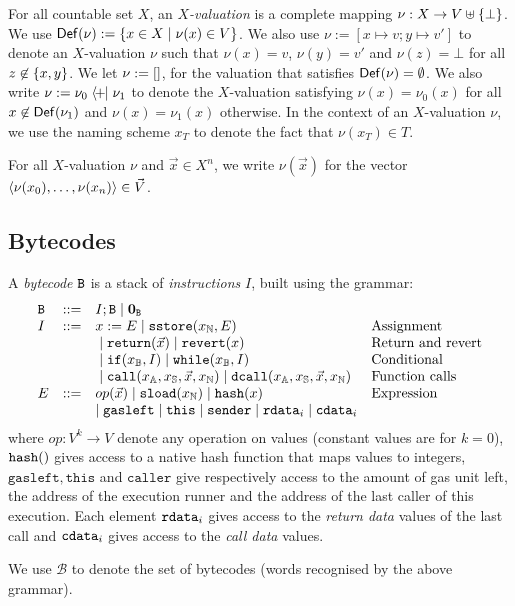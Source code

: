 \documentclass[14pt]{extarticle}
\begin{document}
For all countable set $X$, an \emph{$X$-valuation} is a complete mapping $\nu: X \to V\uplus\{\bot\}$. We use $\mathsf{Def}(\nu):= \{x\in X\mid \nu(x)\in V\}$. We also use $\nu:=[x\mapsto v; y\mapsto v']$ to denote an $X$-valuation $\nu$ such that $\nu(x)=v$, $\nu(y)=v'$ and $\nu(z)=\bot$ for all $z\not\in\{x,y\}$. We let $\nu:=[]$, for the valuation that satisfies $\mathsf{Def}(\nu)=\emptyset$. We also write $\nu:=\nu_0\mathrel{\bf\langle\!+\!\!\mid} \nu_1$ to denote the $X$-valuation satisfying $\nu(x)=\nu_0(x)$ for all $x\not\in\mathsf{Def}(\nu_1)$ and $\nu(x)=\nu_1(x)$ otherwise. In the context of an $X$-valuation $\nu$, we use the naming scheme $x_T$ to denote the fact that $\nu(x_T)\in T$. 

For all $X$-valuation $\nu$ and $\vec x\in X^n$, we write $\nu(\vec x)$ for the vector $\langle{\nu(x_0),\dots,\nu(x_n)}\rangle\in\vec V$.

\subsection{Bytecodes}
A \emph{bytecode} $\mathtt{B}$ is a stack of \emph{instructions} $I$, built using the grammar:
$$\begin{array}{lcll}
\mathtt{B} &:: =& I ; \mathtt{B} \mid \mathbf{0}_{\mathtt{B}} \\
I & :: =& x:=E \mid \mathtt{sstore}(x_{\mathbb{N}},E) & \hbox{Assignment} \\
&&{}\mid \mathtt{return}(\vec x) \mid \mathtt{revert}(x) & \hbox{Return and revert} \\
&& {}\mid \mathtt{if}(x_{\mathbb{B}}, I) \mid \mathtt{while}(x_{\mathbb{B}},I)  & \hbox{Conditional}\\
&&{}\mid \mathtt{call}(x_{\mathbb{A}}, x_{\mathbb{S}}, \vec x, x_{\mathbb{N}}) \mid  \mathtt{dcall}(x_{\mathbb{A}}, x_{\mathbb{S}}, \vec x, x_{\mathbb{N}}) & \hbox{Function calls} \\
E & ::= & op(\vec x)\mid \mathtt{sload}(x_{\mathbb{N}})\mid\mathtt{hash}(x) & \hbox{Expression} \\ 
&& \mid \mathtt{gasleft} \mid \mathtt{this} \mid \mathtt{sender}\mid \mathtt{rdata}_i \mid\mathtt{cdata}_i 
\end{array}
$$
where $op:V^k\to V$ denote any operation on values (constant values are for $k=0$), $\mathtt{hash}()$ gives access to a native hash function that maps values to integers, $\mathtt{gasleft}, \mathtt{this}$ and $\mathtt{caller}$ give respectively access to the amount of gas unit left, the address of the execution runner and the address of the last caller of this execution. Each element $\mathtt{rdata}_i$ gives access to the \emph{return data} values of the last call and $\mathtt{cdata}_i$ gives access to the \emph{call data} values.

We use $\mathcal{B}$ to denote the set of bytecodes (words recognised by the above grammar).
\end{document}
